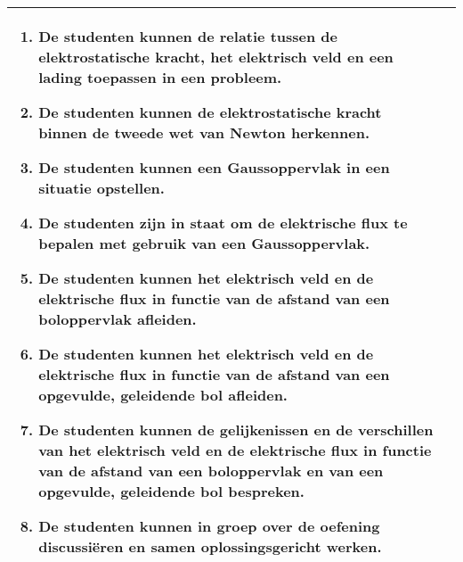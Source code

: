 \begin{landscape}
\begin{tabularx}{1.56\textwidth}{|p{}|X|}
\begin{enumerate}[itemsep=0.08\baselineskip]
			\item De studenten kunnen de relatie tussen de elektrostatische kracht, het elektrisch veld en een lading toepassen in een probleem.
			\item De studenten kunnen de elektrostatische kracht binnen de tweede wet van Newton herkennen.
			\item De studenten kunnen een Gaussoppervlak in een situatie opstellen.
			\item De studenten zijn in staat om de elektrische flux te bepalen met gebruik van een Gaussoppervlak.
			\item De studenten kunnen het elektrisch veld en de elektrische flux  in functie van de afstand  van een boloppervlak afleiden.
			\item De studenten kunnen het elektrisch veld en de elektrische flux  in functie van de afstand van een opgevulde, geleidende bol afleiden.
			\item De studenten kunnen de gelijkenissen en de verschillen van het elektrisch veld en de elektrische flux in functie van de afstand van een boloppervlak en van een opgevulde, geleidende bol bespreken.
		    \item De studenten kunnen in groep over de oefening discussiëren en samen oplossingsgericht werken.
		\end{enumerate} \\\hline
	\end{tabularx}



\end{landscape}
